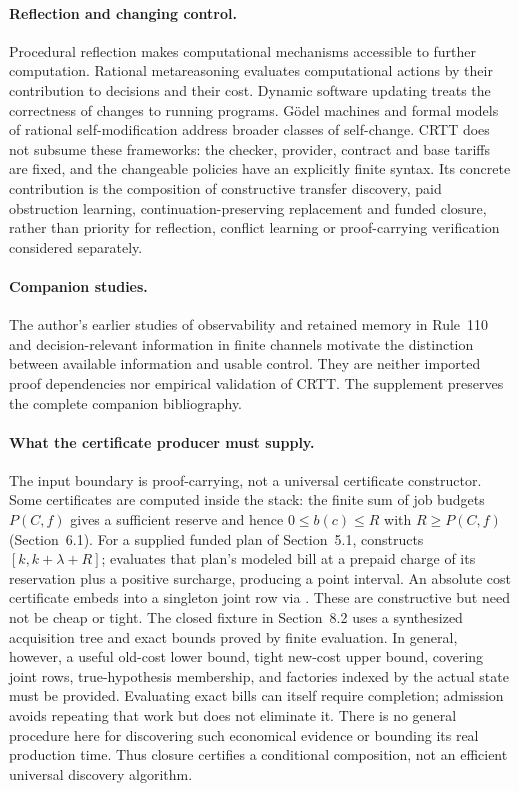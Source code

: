 \paragraph{Reflection and changing control.}
Procedural reflection \cite{smith1984} makes computational mechanisms accessible to further computation. Rational metareasoning \cite{russell1991} evaluates computational actions by their contribution to decisions and their cost. Dynamic software updating \cite{stoyle2007} treats the correctness of changes to running programs. G\"odel machines \cite{schmidhuber2007} and formal models of rational self-modification \cite{everitt2016} address broader classes of self-change. CRTT does not subsume these frameworks: the checker, provider, contract and base tariffs are fixed, and the changeable policies have an explicitly finite syntax. Its concrete contribution is the composition of constructive transfer discovery, paid obstruction learning, continuation-preserving replacement and funded closure, rather than priority for reflection, conflict learning or proof-carrying verification considered separately.

\paragraph{Companion studies.}
The author's earlier studies of observability and retained memory in Rule~110 \cite{strand110observer2026,strand110memory2026} and decision-relevant information in finite channels \cite{strandcontrol2026} motivate the distinction between available information and usable control. They are neither imported proof dependencies nor empirical validation of CRTT. The supplement preserves the complete companion bibliography.

\paragraph{What the certificate producer must supply.}
The input boundary is proof-carrying, not a universal certificate constructor. Some certificates are computed inside the stack: the finite sum of job budgets $P(C,f)$ gives a sufficient reserve and hence $0\le b(c)\le R$ with $R\ge P(C,f)$ (Section~6.1). For a supplied funded plan of Section~5.1,  constructs $[k,k+\lambda+R]$;  evaluates that plan's modeled bill at a prepaid charge of its reservation plus a positive surcharge, producing a point interval. An absolute cost certificate embeds into a singleton joint row via . These are constructive but need not be cheap or tight. The closed fixture in Section~8.2 uses a synthesized acquisition tree and exact bounds proved by finite evaluation. In general, however, a useful old-cost lower bound, tight new-cost upper bound, covering joint rows, true-hypothesis membership, and factories indexed by the actual state must be provided. Evaluating exact bills can itself require completion; admission avoids repeating that work but does not eliminate it. There is no general procedure here for discovering such economical evidence or bounding its real production time. Thus closure certifies a conditional composition, not an efficient universal discovery algorithm.

